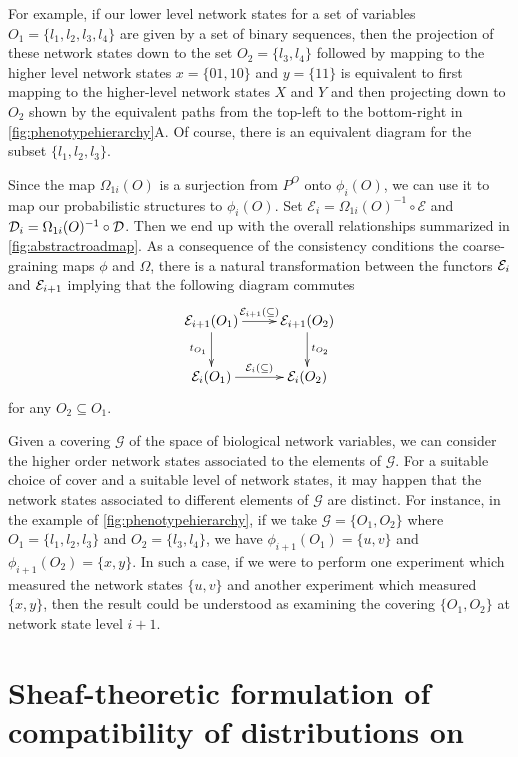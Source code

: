 For example, if our lower level network states for a set of variables $O_1 = \{ l_1,l_2,l_3,l_4 \}$ are given by a set of binary sequences, then the projection of these network states down to the set $O_2 = \{l_3,l_4\}$ followed by mapping to the higher level network states $x=\{01,10\}$ and $y=\{11\}$ is equivalent to first mapping to the higher-level network states $X$ and $Y$ and then projecting down to $O_2$ shown by the equivalent paths from the top-left to the bottom-right in \autoref{fig:phenotypehierarchy}A.
Of course, there is an equivalent diagram for the subset $\{ l_1,l_2,l_3 \}$.

Since the map $\Omega_{1i}(O)$ is a surjection from $P^O$ onto $\phi_i(O)$, we can use it to map our probabilistic structures to $\phi_i(O)$.  Set $\mathcal{E}_i = \Omega_{1i}(O)^{-1} \circ \mathcal{E}$ and $\mathcal{D}_i = \Omega_{1i}(O)^{-1} \circ \mathcal{D}$.  Then we end up with the overall relationships summarized in \autoref{fig:abstractroadmap}. As a consequence of the consistency conditions the coarse-graining maps $\phi$ and $\Omega$, there is a natural transformation between the functors $\mathcal{E}_i$ and $\mathcal{E}_{i+1}$ implying that the following diagram commutes
$$
\xymatrix{
\expr_{i+1}(O_1) \ar[r]^{\expr_{i+1}(\subseteq)} \ar[d]_{t_{O_1}} & \expr_{i+1}(O_2) \ar[d]^{t_{O_2}} \\
\expr_{i}(O_1) \ar[r]^{\expr_{i}(\subseteq)} & \expr_{i}(O_2) }
$$
for any $O_2 \subseteq O_1$.

Given a covering $\mathcal{G}$ of the space of biological network variables, we can consider the higher order network states associated to the elements of $\mathcal{G}$.  For a suitable choice of cover and a suitable level of network states, it may happen that the network states associated to different elements of $\mathcal{G}$ are distinct.  For instance, in the example of \autoref{fig:phenotypehierarchy}, if we take $\mathcal{G} = \{O_1, O_2\}$ where $O_1 = \{l_1, l_2, l_3\}$ and $O_2 = \{l_3, l_4\}$, we have $\phi_{i+1}(O_1) = \{u,v\}$ and $\phi_{i+1}(O_2) = \{x,y\}$.  In such a case, if we were to perform one experiment which measured the network states $\{u,v\}$ and another experiment which measured $\{x,y\}$, then the result could be understood as examining the covering $\{O_1, O_2\}$ at network state level $i+1$.



\section{Sheaf-theoretic formulation of compatibility of distributions on \gnpm{}}\label{secsupp:compatibilityofgpms}


